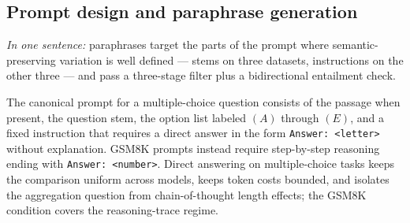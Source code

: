 \begin{table}[htbp]
\centering
\small
\caption{Evaluated systems, endpoints, and coverage across the two suites. Parse rate is the fraction of calls from which the mandated answer format was extracted after retries; $n$ is the number of questions with a complete call matrix. $^\dagger$Also the stem-paraphrase generator; its held-out row carries a self-preference risk (Section~\ref{sec:setup}) and is a partial replication excluded from pooled analyses. $^\ddagger$Completed on the second endpoint after the first exhausted its free tier. $^\S$Partial (13 of 119), excluded from tabulation. All systems run direct-answer on multiple-choice tasks and chain-of-thought on GSM8K.}
\label{tab:models}

\end{table}

\subsection{Prompt design and paraphrase generation}

\emph{In one sentence:} paraphrases target the parts of the prompt where semantic-preserving variation is well defined --- stems on three datasets, instructions on the other three --- and pass a three-stage filter plus a bidirectional entailment check.

The canonical prompt for a multiple-choice question consists of the passage when present, the question stem, the option list labeled $(A)$ through $(E)$, and a fixed instruction that requires a direct answer in the form \texttt{Answer: <letter>} without explanation. GSM8K prompts instead require step-by-step reasoning ending with \texttt{Answer: <number>}. Direct answering on multiple-choice tasks keeps the comparison uniform across models, keeps token costs bounded, and isolates the aggregation question from chain-of-thought length effects; the GSM8K condition covers the reasoning-trace regime.

